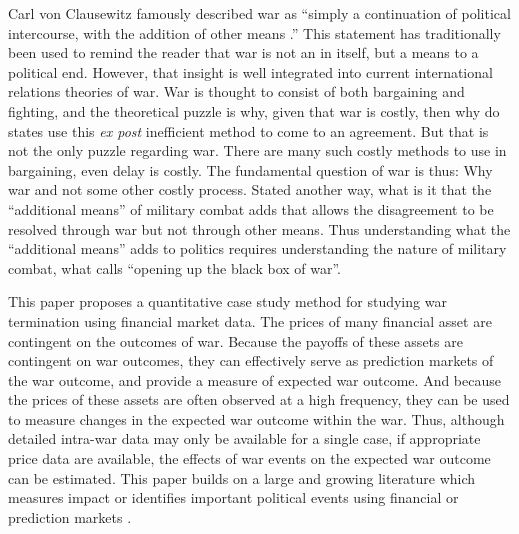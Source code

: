 

Carl von Clausewitz famously described war as ``simply a continuation of political intercourse, with the addition of other means \parencite[605]{Clausewitz1989}.'' %
This statement has traditionally been used to remind the reader that
war is not an in itself, but a means to a political end. %
However, that insight is well integrated into current international relations theories of war. %
War is thought to consist of both bargaining and fighting, and the theoretical puzzle is why, given that war is costly, then why do states use this \textit{ex post} inefficient method to come to an agreement. %
But that is not the only puzzle regarding war. %
There are many such costly methods to use in bargaining, even delay is costly. %
The fundamental question of war is thus: Why war and not some other costly process. %
Stated another way, what is it that the ``additional means'' of military combat adds that allows the disagreement to be resolved through war but not through other means. %
Thus understanding what the ``additional means'' adds to politics requires understanding the nature of military combat, what \textcite{Gartner1998} calls ``opening up the black box of war''.

This paper proposes a quantitative case study method for studying war termination using financial market data. The prices of many financial asset are contingent on the outcomes of war. Because the payoffs of these assets are contingent on war outcomes, they can effectively serve as prediction markets of the war outcome, and provide a measure of expected war outcome. And because the prices of these assets are often observed at a high frequency, they can be used to measure changes in the expected war outcome within the war. Thus, although
detailed intra-war data may only be available for a single case, if
appropriate price data are available, the effects of war events on the
expected war outcome can be estimated. This paper builds on a large and
growing literature which measures impact or identifies important
political events using financial
\parencites{NorthWeingast1989}{north2000introd}{FreyKucher2000}{sussman2000instit}{wells2000revol}{Herron2000}{eldor2004finan}{ChenSiems2004}{Greenstone2007}
or prediction
markets \parencites{WolfersZitzewitz2004}{ArrowForsytheGorhamEtAl2008}{WolfersZitzewitz2009}.


